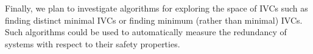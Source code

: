 Finally, we plan to investigate algorithms for exploring the space of IVCs such as finding distinct minimal IVCs or finding minimum (rather than minimal) IVCs. Such algorithms could be used to automatically measure the redundancy of systems with respect to their safety properties.



